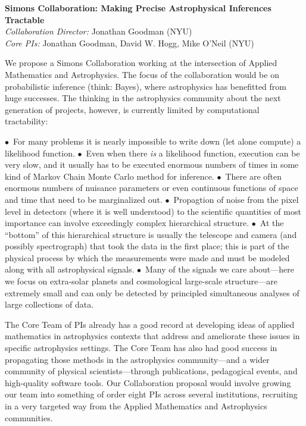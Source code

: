\documentclass[12pt]{article}
\newcommand{\hoggitem}{$\bullet$}
\begin{document}
\sloppy\sloppypar\thispagestyle{empty}

\noindent
\textbf{Simons Collaboration: Making Precise Astrophysical Inferences Tractable}\\
\textit{Collaboration Director:} Jonathan Goodman (NYU)\\
\textit{Core PIs:} Jonathan Goodman, David W. Hogg, Mike O'Neil (NYU)
\bigskip

We propose a Simons Collaboration working at the intersection of
Applied Mathematics and Astrophysics.
The focus of the collaboration would be on probabilistic inference
(think: Bayes), where astrophysics has benefitted from huge successes.
The thinking in the astrophysics community about the next generation of
projects, however, is currently limited by computational tractability:

\hoggitem~For many problems it is nearly impossible to write down (let
alone compute) a likelihood function.
\hoggitem~Even when there \emph{is} a likelihood function, execution
can be very slow, and it usually has to be executed enormous numbers
of times in some kind of Markov Chain Monte Carlo method for
inference.
\hoggitem~There are often enormous numbers of nuisance parameters or
even continuous functions of space and time that need to be
marginalized out.
\hoggitem~Propagtion of noise from the pixel level in detectors (where
it is well understood) to the scientific quantities of most importance
can involve exceedingly complex hierarchical structure.
\hoggitem~At the ``bottom'' of this hierarchical structure is usually
the telescope and camera (and possibly spectrograph) that took the
data in the first place; this is part of the physical process by which
the measurements were made and must be modeled along with all
astrophysical signals.
\hoggitem~Many of the signals we care about---here we focus on
extra-solar planets and cosmological large-scale structure---are
extremely small and can only be detected by principled simultaneous
analyses of large collections of data.

The Core Team of PIs already has a good record at developing ideas of
applied mathematics in astrophysics contexts that address and
ameliorate these issues in specific astrophysics settings.
The Core Team has also had good success in propagating those methods
in the astrophysics community---and a wider community of physical
scientists---through publications, pedagogical events, and
high-quality software tools.
Our Collaboration proposal would involve growing our team into
something of order eight PIs across several institutions, recruiting
in a very targeted way from the Applied Mathematics and Astrophysics
communities.
\end{document}

